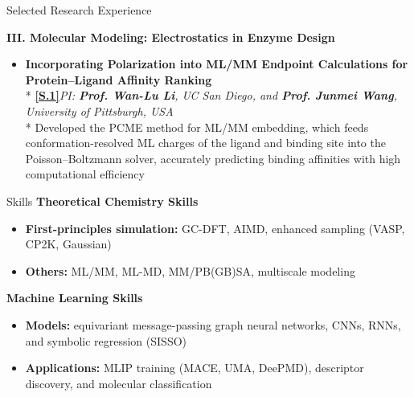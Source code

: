 \documentclass{resume} %
\begin{document}
\begin{rSection}{Selected Research Experience}
\begin{itemize}[itemsep=6pt]
\end{itemize}
\textbf{III. Molecular Modeling: Electrostatics in Enzyme Design}\par
\begin{itemize}[itemsep=6pt]
  \item \textbf{Incorporating Polarization into ML/MM Endpoint Calculations for Protein--Ligand Affinity Ranking} \\* {\small\hyperlink{S.1}{\textbf{[S.1]}}}\hfill{\small\textit{PI: \textbf{Prof. Wan-Lu Li}, UC San Diego, and \textbf{Prof. Junmei Wang}, University of Pittsburgh, USA}} \\* Developed the PCME method for ML/MM embedding, which feeds conformation-resolved ML charges of the ligand and binding site into the Poisson--Boltzmann solver, accurately predicting binding affinities with high computational efficiency


\end{itemize}
\end{rSection}
\begin{rSection}{Skills}
\textbf{Theoretical Chemistry Skills}
\begin{itemize}
  \item \textbf{First-principles simulation:} GC-DFT, AIMD, enhanced sampling (VASP, CP2K, Gaussian)
  \item \textbf{Others:} ML/MM, ML-MD, MM/PB(GB)SA, multiscale modeling
\end{itemize}
\textbf{Machine Learning Skills}
\begin{itemize}
  \item \textbf{Models:} equivariant message-passing graph neural networks, CNNs, RNNs, and symbolic regression (SISSO)
  \item \textbf{Applications:} MLIP training (MACE, UMA, DeePMD), descriptor discovery, and molecular classification
\end{itemize}
\end{rSection}
\end{document}
